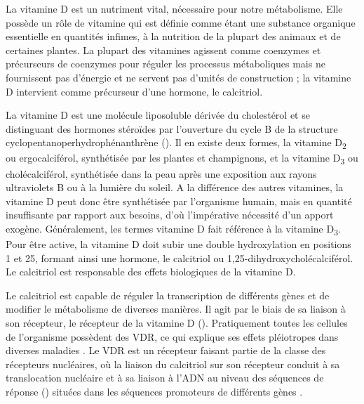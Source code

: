 \documentclass[
  a4paper,
  DIV=11,
  numbers=noendperiod,
  listof=totoc]{scrreprt}
\begin{document}
La vitamine D est un nutriment vital, nécessaire pour notre métabolisme.
Elle possède un rôle de vitamine qui est définie comme étant une
substance organique essentielle en quantités infimes, à la nutrition de
la plupart des animaux et de certaines plantes. La plupart des vitamines
agissent comme coenzymes et précurseurs de coenzymes pour réguler les
processus métaboliques mais ne fournissent pas d'énergie et ne servent
pas d'unités de construction \autocite{Ellison.2021} ; la vitamine D
intervient comme précurseur d'une hormone, le calcitriol.

La vitamine D est une molécule liposoluble dérivée du cholestérol et se
distinguant des hormones stéroïdes par l'ouverture du cycle B de la
structure cyclopentanoperhydrophénanthrène \autocite{Norman.2008}
(). Il en existe deux formes, la vitamine
D\textsubscript{2} ou ergocalciférol, synthétisée par les plantes et
champignons, et la vitamine D\textsubscript{3} ou cholécalciférol,
synthétisée dans la peau après une exposition aux rayons ultraviolets B
ou à la lumière du soleil. A la différence des autres vitamines, la
vitamine D peut donc être synthétisée par l'organisme humain, mais en
quantité insuffisante par rapport aux besoins, d'où l'impérative
nécessité d'un apport exogène. Généralement, les termes vitamine D fait
référence à la vitamine D\textsubscript{3}. Pour être active, la
vitamine D doit subir une double hydroxylation en positions 1 et 25,
formant ainsi une hormone, le calcitriol ou
1,25-dihydroxycholécalciférol. Le calcitriol est responsable des effets
biologiques de la vitamine D.

Le calcitriol est capable de réguler la transcription de différents
gènes et de modifier le métabolisme de diverses manières. Il agit par le
biais de sa liaison à son récepteur, le récepteur de la vitamine D
(). Pratiquement toutes les cellules de l'organisme possèdent
des \ac{VDR}, ce qui explique ses effets pléiotropes dans diverses
maladies \autocite{Ellison.2021,Caprio.2017,Norman.2008}. Le \ac{VDR}
est un récepteur faisant partie de la classe des récepteurs nucléaires,
où la liaison du calcitriol sur son récepteur conduit à sa translocation
nucléaire et à sa liaison à l'ADN au niveau des séquences de réponse
() situées dans les séquences promoteurs de différents gènes
\autocite{Bouillon.2008}.
\end{document}
